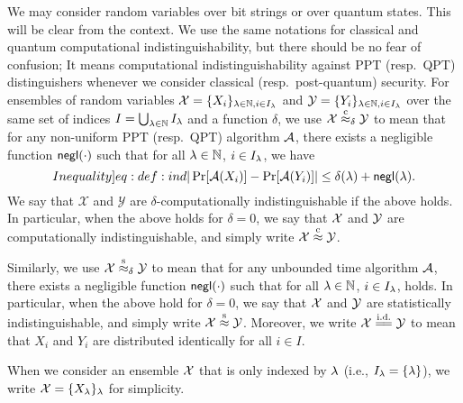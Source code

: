 We may consider random variables over bit strings or over quantum states. 
This will be clear from the context.
We use the same notations for classical and quantum computational indistinguishability, but there should be no fear of confusion; It means computational indistinguishability against PPT (resp.\ QPT) distinguishers whenever we consider classical (resp.\ post-quantum) security.
For ensembles of random variables $\mathcal{X}=\{X_i\}_{\lambda\in \mathbb{N},i\in I_\lambda}$ and $\mathcal{Y}=\{Y_i\}_{\lambda\in \mathbb{N},i\in I_\lambda}$ over the same set of indices $I=\bigcup_{\lambda\in\mathbb{N}}I_\lambda$ and a function $\delta$,       
we use $\mathcal{X}\stackrel{\text{c}}{\approx}_{\delta}\mathcal{Y}$ to mean that for any non-uniform PPT (resp.\ QPT) algorithm $\mathcal{A}$, there exists a negligible function $\mathsf{negl}(\cdot)$ such that for all $\lambda\in\mathbb{N}$, $i\in I_\lambda$, we have
\begin{equation}\label[Inequality]{eq:def:ind}
|\Pr[\mcal{A}(X_i)]-\Pr[\mcal{A}(Y_i)]|\leq \delta(\secpar) + \negl(\secpar).
\end{equation}
We say that $\mathcal{X}$ and $\mathcal{Y}$ are $\delta$-computationally indistinguishable if the above holds. 
In particular, when the above holds for $\delta=0$, we say that $\mathcal{X}$ and $\mathcal{Y}$ are computationally indistinguishable, and simply write $\mathcal{X}\stackrel{\text{c}}{\approx} \mathcal{Y}$.

Similarly, we use $\mathcal{X}\stackrel{\text{s}}{\approx}_{\delta}\mathcal{Y}$ to mean that for any unbounded time  algorithm $\mathcal{A}$, there exists a negligible function $\mathsf{negl}(\cdot)$ such that for all $\lambda\in\mathbb{N}$, $i\in I_\lambda$,  holds. In particular, when the above hold for $\delta=0$, we say that $\mathcal{X}$ and $\mathcal{Y}$ are statistically indistinguishable, and simply write $\mathcal{X}\stackrel{\text{s}}{\approx} \mathcal{Y}$.
Moreover,  
we write $\mathcal{X} \stackrel{\text{i.d.}}{=\mathrel{\mkern-3mu}=} \mathcal{Y}$ to mean
that $X_i$ and $Y_i$ are distributed identically for all $i\in I$. 

When we consider an ensemble $\mathcal{X}$ that is only indexed by $\lambda$ (i.e., $I_\lambda=\{\lambda\}$), we write $\mathcal{X}=\{X_\lambda\}_\lambda$ for simplicity.

